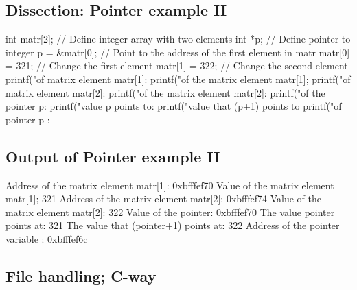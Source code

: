 \documentclass[%
twoside,                 %
final,                   %
10pt]{article}
\newenvironment{block_mdfboxadmon}[1][]{
\begin{block_mdfboxmdframed}[frametitle=#1]
}
{
\end{block_mdfboxmdframed}
}
\begin{document}
\subsection{Dissection: Pointer example II}


\begin{block_mdfboxadmon}[]
\bcppcod
int matr[2];    // Define integer array with two elements
int *p;         // Define pointer to integer
p = &matr[0];   // Point to the address of the first element in matr
matr[0] = 321;  // Change the first element
matr[1] = 322;  // Change the second element
printf("\nAddress of matrix element matr[1]: %
printf("\nValue of the  matrix element  matr[1]; %
printf("\nAddress of matrix element matr[2]: %
printf("\nValue of the matrix element  matr[2]: %
printf("\nValue of the pointer p: %
printf("\nThe value p points to: %
printf("\nThe value that (p+1) points to  %
printf("\nAddress of pointer p : %
\ecppcod
\end{block_mdfboxadmon}




\subsection{Output of Pointer example II}


\begin{block_mdfboxadmon}[]
\bccq
Address of the matrix element matr[1]: 0xbfffef70
Value of the  matrix element  matr[1]; 321
Address of the matrix element matr[2]: 0xbfffef74
Value of the matrix element  matr[2]: 322
Value of the pointer: 0xbfffef70
The value pointer points at: 321
The value that (pointer+1) points at:  322
Address of the pointer variable : 0xbfffef6c
\eccq
\end{block_mdfboxadmon}



\subsection{File handling; C-way}
\end{document}
